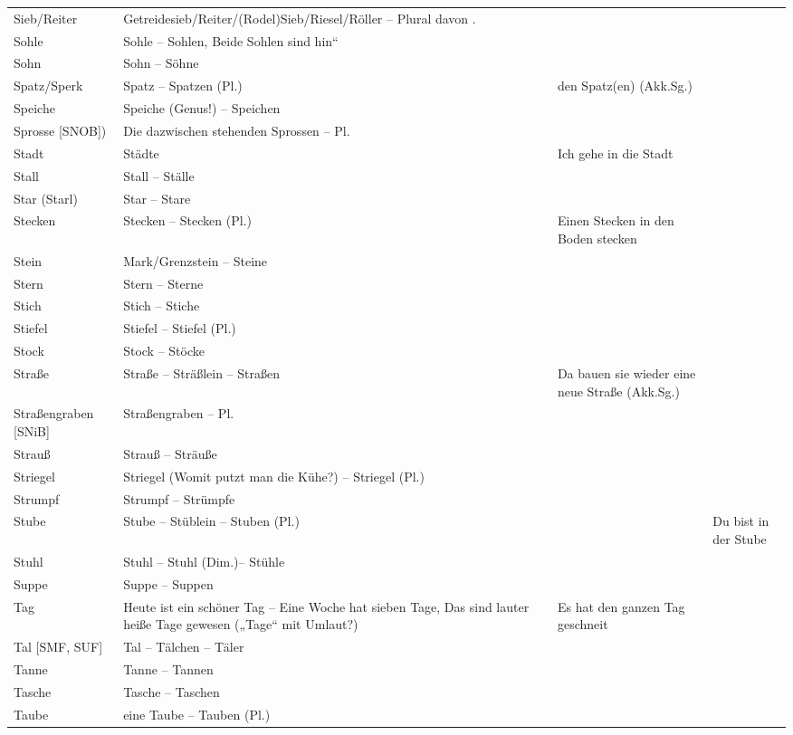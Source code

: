 {\begin{xltabular}{\textwidth}{>{\raggedright\arraybackslash}p{.15\textwidth}QQQ}
Sieb\slash Reiter & Getreidesieb\slash Reiter\slash (Rodel)Sieb\slash Riesel\slash Röller -- Plural davon . &  & \\
Sohle & Sohle -- Sohlen, Beide Sohlen sind hin“ &  & \\
Sohn & Sohn -- Söhne &  & \\
Spatz\slash Sperk & Spatz -- Spatzen (Pl.) & den Spatz(en) (Akk.Sg.) & \\
Speiche & Speiche (Genus!) -- Speichen &  & \\
Sprosse [SNOB]) & Die dazwischen stehenden Sprossen -- Pl. &  & \\
Stadt & Städte & Ich gehe in die Stadt & \\
Stall & Stall -- Ställe &  & \\
Star (Starl) & Star -- Stare &  & \\
Stecken & Stecken -- Stecken (Pl.) & Einen Stecken in den Boden stecken & \\
Stein & Mark\slash Grenzstein -- Steine &  & \\
Stern & Stern -- Sterne &  & \\
Stich & Stich -- Stiche &  & \\
Stiefel & Stiefel -- Stiefel (Pl.) &  & \\
Stock & Stock -- Stöcke &  & \\
Straße & Straße -- Sträßlein -- Straßen & Da bauen sie wieder eine neue Straße (Akk.Sg.) & \\
Straßen\-graben [SNiB] & Straßengraben -- Pl. &  & \\
Strauß & Strauß -- Sträuße &  & \\
Striegel & Striegel (Womit putzt man die Kühe?) -- Striegel (Pl.) &  & \\
Strumpf & Strumpf -- Strümpfe &  & \\
Stube & Stube -- Stüblein -- Stuben (Pl.) &  & Du bist in der Stube\\
Stuhl & Stuhl -- Stuhl (Dim.)-- Stühle &  & \\
Suppe & Suppe -- Suppen &  & \\
Tag & Heute ist ein schöner Tag -- Eine Woche hat sieben Tage, Das sind lauter heiße Tage gewesen („Tage“ mit Umlaut?) & Es hat den ganzen Tag geschneit & \\
Tal [SMF, SUF] & Tal -- Tälchen -- Täler &  & \\
Tanne & Tanne -- Tannen &  & \\
Tasche & Tasche -- Taschen &  & \\
Taube & eine Taube -- Tauben (Pl.) &  & \\

\end{xltabular}}
